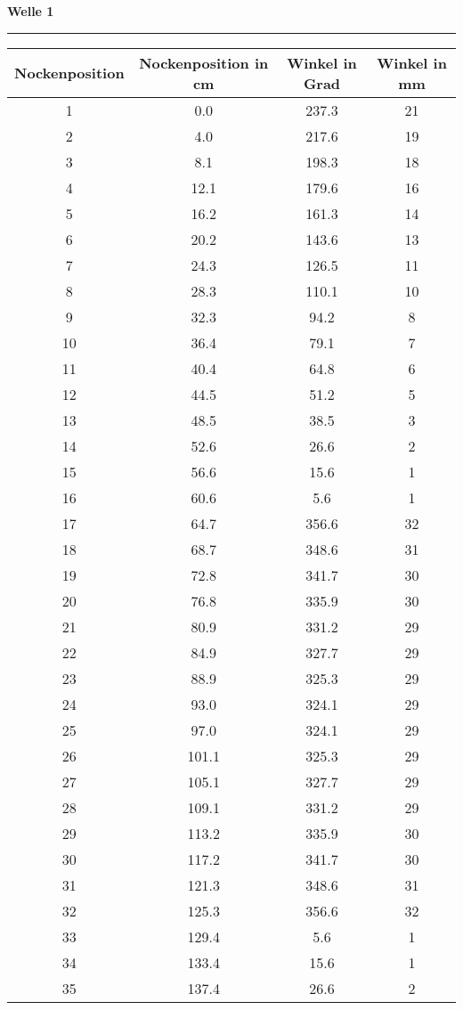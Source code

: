 \documentclass[10pt, a4paper]{article}
\begin{document}
\centerline{{\bf Welle 1} }
\rule{1.0\textwidth}{0.5mm}
\begin{center}
	\begin{tabular}{c|c|c|c}
		Nockenposition & Nockenposition in cm & Winkel in Grad & Winkel in mm \\
		\hline
		1 & 0.0 & 237.3 & 21 \\
		2 & 4.0 & 217.6 & 19 \\
		3 & 8.1 & 198.3 & 18 \\
		4 & 12.1 & 179.6 & 16 \\
		5 & 16.2 & 161.3 & 14 \\
		6 & 20.2 & 143.6 & 13 \\
		7 & 24.3 & 126.5 & 11 \\
		8 & 28.3 & 110.1 & 10 \\
		9 & 32.3 & 94.2 & 8 \\
		10 & 36.4 & 79.1 & 7 \\
		11 & 40.4 & 64.8 & 6 \\
		12 & 44.5 & 51.2 & 5 \\
		13 & 48.5 & 38.5 & 3 \\
		14 & 52.6 & 26.6 & 2 \\
		15 & 56.6 & 15.6 & 1 \\
		16 & 60.6 & 5.6 & 1 \\
		17 & 64.7 & 356.6 & 32 \\
		18 & 68.7 & 348.6 & 31 \\
		19 & 72.8 & 341.7 & 30 \\
		20 & 76.8 & 335.9 & 30 \\
		21 & 80.9 & 331.2 & 29 \\
		22 & 84.9 & 327.7 & 29 \\
		23 & 88.9 & 325.3 & 29 \\
		24 & 93.0 & 324.1 & 29 \\
		25 & 97.0 & 324.1 & 29 \\
		26 & 101.1 & 325.3 & 29 \\
		27 & 105.1 & 327.7 & 29 \\
		28 & 109.1 & 331.2 & 29 \\
		29 & 113.2 & 335.9 & 30 \\
		30 & 117.2 & 341.7 & 30 \\
		31 & 121.3 & 348.6 & 31 \\
		32 & 125.3 & 356.6 & 32 \\
		33 & 129.4 & 5.6 & 1 \\
		34 & 133.4 & 15.6 & 1 \\
		35 & 137.4 & 26.6 & 2 \\

\end{tabular}
\end{center}
\end{document}
